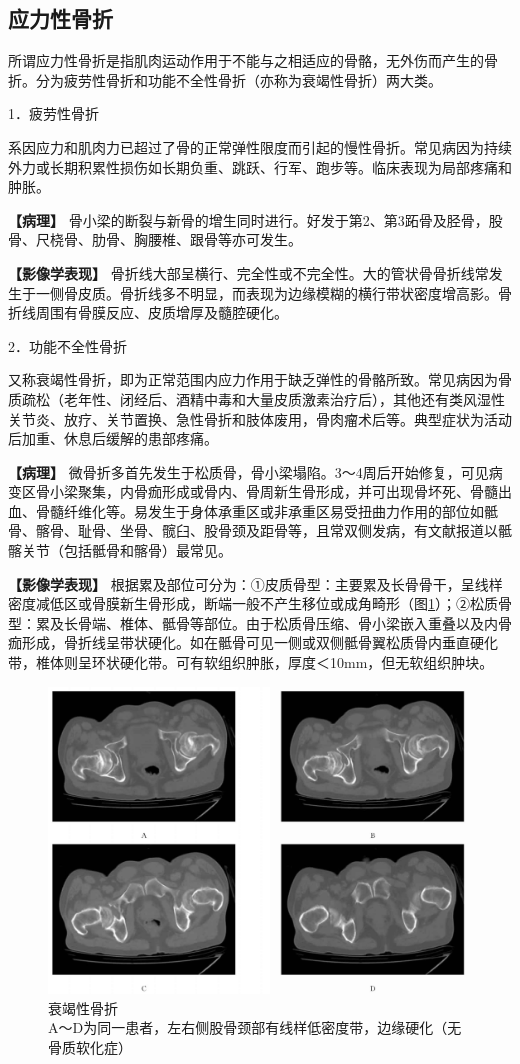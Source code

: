 \subsection{应力性骨折}

所谓应力性骨折是指肌肉运动作用于不能与之相适应的骨骼，无外伤而产生的骨折。分为疲劳性骨折和功能不全性骨折（亦称为衰竭性骨折）两大类。

1．疲劳性骨折

系因应力和肌肉力已超过了骨的正常弹性限度而引起的慢性骨折。常见病因为持续外力或长期积累性损伤如长期负重、跳跃、行军、跑步等。临床表现为局部疼痛和肿胀。

\textbf{【病理】}
骨小梁的断裂与新骨的增生同时进行。好发于第2、第3跖骨及胫骨，股骨、尺桡骨、肋骨、胸腰椎、跟骨等亦可发生。

\textbf{【影像学表现】}
骨折线大部呈横行、完全性或不完全性。大的管状骨骨折线常发生于一侧骨皮质。骨折线多不明显，而表现为边缘模糊的横行带状密度增高影。骨折线周围有骨膜反应、皮质增厚及髓腔硬化。

2．功能不全性骨折

又称衰竭性骨折，即为正常范围内应力作用于缺乏弹性的骨骼所致。常见病因为骨质疏松（老年性、闭经后、酒精中毒和大量皮质激素治疗后），其他还有类风湿性关节炎、放疗、关节置换、急性骨折和肢体废用，骨肉瘤术后等。典型症状为活动后加重、休息后缓解的患部疼痛。

\textbf{【病理】}
微骨折多首先发生于松质骨，骨小梁塌陷。3～4周后开始修复，可见病变区骨小梁聚集，内骨痂形成或骨内、骨周新生骨形成，并可出现骨坏死、骨髓出血、骨髓纤维化等。易发生于身体承重区或非承重区易受扭曲力作用的部位如骶骨、髂骨、耻骨、坐骨、髋臼、股骨颈及距骨等，且常双侧发病，有文献报道以骶髂关节（包括骶骨和髂骨）最常见。

\textbf{【影像学表现】}
根据累及部位可分为：①皮质骨型：主要累及长骨骨干，呈线样密度减低区或骨膜新生骨形成，断端一般不产生移位或成角畸形（图\ref{fig22-9}）；②松质骨型：累及长骨端、椎体、骶骨等部位。由于松质骨压缩、骨小梁嵌入重叠以及内骨痂形成，骨折线呈带状硬化。如在骶骨可见一侧或双侧骶骨翼松质骨内垂直硬化带，椎体则呈环状硬化带。可有软组织肿胀，厚度＜10mm，但无软组织肿块。

\begin{figure}[!htbp]
 \centering
 \includegraphics[width=.7\textwidth,height=\textheight,keepaspectratio]{./images/Image00425.jpg}
 \captionsetup{justification=centering}
 \caption{衰竭性骨折\\{\small A～D为同一患者，左右侧股骨颈部有线样低密度带，边缘硬化（无骨质软化症）}}
 \label{fig22-9}
  \end{figure} 

